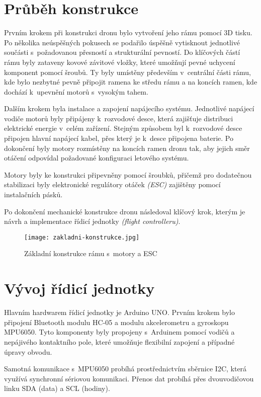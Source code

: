 \documentclass[12pt]{report}
\begin{document}
\chapter[Průběh konstrukce]{Průběh konstrukce}
Prvním krokem při konstrukci dronu bylo vytvoření jeho rámu pomocí 3D tisku. Po několika neúspěšných pokusech se podařilo úspěšně vytisknout jednotlivé součásti s~požadovanou přesností a strukturální pevností. Do klíčových částí rámu byly zataveny kovové závitové vložky, které umožňují pevné uchycení komponent pomocí šroubů. Ty byly umístěny především v~centrální části rámu, kde bylo nezbytné pevně připojit ramena ke středu rámu a na koncích ramen, kde dochází k~upevnění motorů s~vysokým tahem.

Dalším krokem byla instalace a zapojení napájecího systému. Jednotlivé napájecí vodiče motorů byly připájeny k~rozvodové desce, která zajišťuje distribuci elektrické energie v~celém zařízení. Stejným způsobem byl k~rozvodové desce připojen hlavní napájecí kabel, přes který je k~desce připojena baterie. Po dokončení byly motory rozmístěny na koncích ramen dronu tak, aby jejich směr otáčení odpovídal požadované konfiguraci letového systému.

Motory byly ke konstrukci připevněny pomocí šroubků, přičemž pro dodatečnou stabilizaci byly elektronické regulátory otáček \textit{(ESC)} zajištěny pomocí instalačních pásků.

Po dokončení mechanické konstrukce dronu následoval klíčový krok, kterým je návrh a implementace řídicí jednotky \textit{(flight controlleru)}.

\begin{figure}[H]
	\centering
	\texttt{[image: zakladni-konstrukce.jpg]}
	\caption{Základní konstrukce rámu s~motory a ESC}
	\label{fig:zakladni-konstrukce.jpg}
\end{figure}

\chapter[Vývoj řídicí jednotky]{Vývoj řídicí jednotky}
Hlavním hardwarem řídicí jednotky je Arduino UNO. Prvním krokem bylo připojení Bluetooth modulu HC-05 a modulu akcelerometru a gyroskopu MPU6050. Tyto komponenty byly propojeny s~Arduinem pomocí vodičů a nepájivého kontaktního pole, které umožňuje flexibilní zapojení a případné úpravy obvodu.

Samotná komunikace s~MPU6050 probíhá prostřednictvím sběrnice I2C, která využívá synchronní sériovou komunikaci. Přenos dat probíhá přes dvouvodičovou linku SDA (data) a SCL (hodiny). \cite{i2c}
\end{document}
